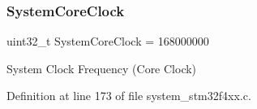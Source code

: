 \subsubsection{\texorpdfstring{System\+Core\+Clock}{SystemCoreClock}}
{\footnotesize\ttfamily uint32\+\_\+t System\+Core\+Clock = 168000000}

System Clock Frequency (Core Clock) 

Definition at line 173 of file system\+\_\+stm32f4xx.\+c.

